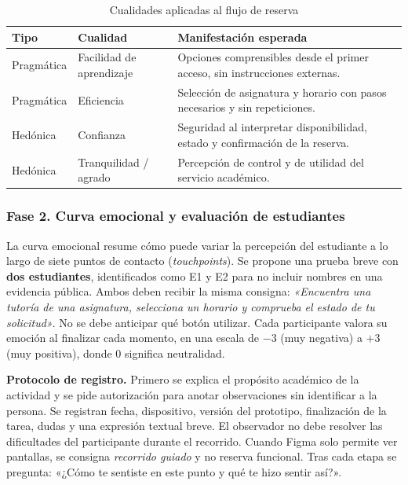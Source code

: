 \documentclass[10pt,letterpaper]{article}
\begin{document}
\begin{table}[H]\centering\small
\caption{Cualidades aplicadas al flujo de reserva}\label{tab:cualidades}
\begin{tabularx}{\linewidth}{@{}p{2.25cm}p{2.35cm}X@{}}\toprule
\textbf{Tipo}&\textbf{Cualidad}&\textbf{Manifestación esperada}\\\midrule
Pragmática&Facilidad de aprendizaje&Opciones comprensibles desde el primer acceso, sin instrucciones externas.\\
Pragmática&Eficiencia&Selección de asignatura y horario con pasos necesarios y sin repeticiones.\\
Hedónica&Confianza&Seguridad al interpretar disponibilidad, estado y confirmación de la reserva.\\
Hedónica&Tranquilidad / agrado&Percepción de control y de utilidad del servicio académico.\\\bottomrule
\end{tabularx}\end{table}

\subsubsection{Fase 2. Curva emocional y evaluación de estudiantes}
La curva emocional resume cómo puede variar la percepción del estudiante a lo largo de siete puntos de contacto (\textit{touchpoints}). Se propone una prueba breve con \textbf{dos estudiantes}, identificados como E1 y E2 para no incluir nombres en una evidencia pública. Ambos deben recibir la misma consigna: \emph{«Encuentra una tutoría de una asignatura, selecciona un horario y comprueba el estado de tu solicitud»}. No se debe anticipar qué botón utilizar. Cada participante valora su emoción al finalizar cada momento, en una escala de $-3$ (muy negativa) a $+3$ (muy positiva), donde $0$ significa neutralidad.

\textbf{Protocolo de registro.} Primero se explica el propósito académico de la actividad y se pide autorización para anotar observaciones sin identificar a la persona. Se registran fecha, dispositivo, versión del prototipo, finalización de la tarea, dudas y una expresión textual breve. El observador no debe resolver las dificultades del participante durante el recorrido. Cuando Figma solo permite ver pantallas, se consigna \emph{recorrido guiado} y no reserva funcional. Tras cada etapa se pregunta: «¿Cómo te sentiste en este punto y qué te hizo sentir así?».
\end{document}
